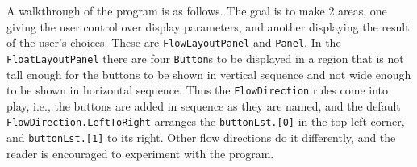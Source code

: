 \documentclass[fsharpnotes.tex]{subfiles}
\begin{document}
A walkthrough of the program is as follows. The goal is to make 2 areas, one giving the user control over display parameters, and another displaying the result of the user's choices. These are \lstinline{FlowLayoutPanel} and \lstinline{Panel}. In the \lstinline{FloatLayoutPanel} there are four \lstinline{Button}s to be displayed in a region that is not tall enough for the buttons to be shown in vertical sequence and not wide enough to be shown in horizontal sequence. Thus the \lstinline{FlowDirection} rules come into play, i.e., the buttons are added in sequence as they are named, and the default \lstinline{FlowDirection.LeftToRight} arranges the \lstinline{buttonLst.[0]} in the top left corner, and \lstinline{buttonLst.[1]} to its right. Other flow directions do it differently, and the reader is encouraged to experiment with the program.
\end{document}
